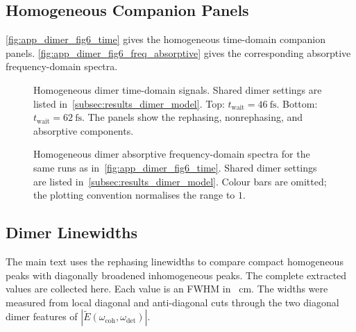 \subsection{Homogeneous Companion Panels}
\autoref{fig:app_dimer_fig6_time} gives the homogeneous time-domain companion
panels. \autoref{fig:app_dimer_fig6_freq_absorptive} gives the corresponding
absorptive frequency-domain spectra.

\begin{figure}[htbp]
    \centering
    \caption{Homogeneous dimer time-domain signals. Shared dimer settings are
    listed in~\autoref{subsec:results_dimer_model}. Top:
    \(t_{\mathrm{wait}}=\SI{46}{\femto\second}\). Bottom:
    \(t_{\mathrm{wait}}=\SI{62}{\femto\second}\). The panels show the rephasing,
    nonrephasing, and absorptive components.}
    \label{fig:app_dimer_fig6_time}
\end{figure}

\begin{figure}[htbp]
    \centering
    \caption{Homogeneous dimer absorptive frequency-domain spectra
    for the same runs as in~\autoref{fig:app_dimer_fig6_time}. Shared dimer
    settings are listed in~\autoref{subsec:results_dimer_model}. Colour bars
    are omitted; the plotting convention normalises the range to \(1\).}
    \label{fig:app_dimer_fig6_freq_absorptive}
\end{figure}

\subsection{Dimer Linewidths}

The main text uses the rephasing linewidths to compare compact homogeneous
peaks with diagonally broadened inhomogeneous peaks. The complete extracted
values are collected here. Each value is an FWHM in \si{\per\centi\metre}. The
widths were measured from local diagonal and anti-diagonal cuts through the two
diagonal dimer features of
\(|\tilde{E}(\omega_{\mathrm{coh}},\omega_{\mathrm{det}})|\).

